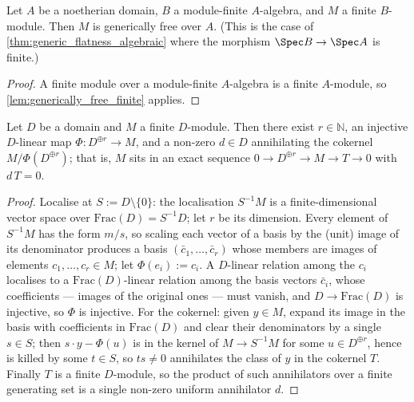 \begin{lemma}
  \label{lem:generically_free_module_finite}
  Let \(A\) be a noetherian domain, \(B\) a module-finite \(A\)-algebra, and
  \(M\) a finite \(B\)-module.  Then \(M\) is generically free over \(A\).
  (This is the case of \cref{thm:generic_flatness_algebraic} where the
  morphism \(\Spec B \to \Spec A\) is finite.)
\end{lemma}

\begin{proof}
\leanok
  A finite module over a module-finite \(A\)-algebra is a finite
  \(A\)-module, so \cref{lem:generically_free_finite} applies.
\end{proof}

\begin{lemma}
  \label{lem:generic_rank_comparison}
  Let \(D\) be a domain and \(M\) a finite \(D\)-module.  Then there exist
  \(r \in \mathbb{N}\), an injective \(D\)-linear map
  \(\Phi : D^{\oplus r} \to M\),
  and a non-zero \(d \in D\) annihilating the cokernel
  \(M / \Phi(D^{\oplus r})\); that is, \(M\) sits in an exact sequence
  \(0 \to D^{\oplus r} \to M \to T \to 0\) with \(d\,T = 0\).
\end{lemma}

\begin{proof}
\leanok
  Localise at \(S := D \setminus \{0\}\): the localisation \(S^{-1}M\) is a
  finite-dimensional vector space over \(\mathrm{Frac}(D) = S^{-1}D\); let
  \(r\) be its dimension.  Every element of \(S^{-1}M\) has the form
  \(m/s\), so scaling each vector of a basis by the (unit) image of its
  denominator produces a basis \((\bar c_1, \dots, \bar c_r)\) whose members
  are images of elements \(c_1, \dots, c_r \in M\); let
  \(\Phi(e_i) := c_i\).  A \(D\)-linear relation among the \(c_i\)
  localises to a \(\mathrm{Frac}(D)\)-linear relation among the basis
  vectors \(\bar c_i\), whose coefficients — images of the original ones —
  must vanish, and \(D \to \mathrm{Frac}(D)\) is injective, so \(\Phi\) is
  injective.  For the cokernel: given \(y \in M\), expand its image in the
  basis with coefficients in \(\mathrm{Frac}(D)\) and clear their
  denominators by a single \(s \in S\); then \(s \cdot y - \Phi(u)\) is in
  the kernel of \(M \to S^{-1}M\) for some \(u \in D^{\oplus r}\), hence is
  killed by some \(t \in S\), so \(ts \ne 0\) annihilates the class of
  \(y\) in the cokernel \(T\).  Finally \(T\) is a finite \(D\)-module, so
  the product of such annihilators over a finite generating set is a single
  non-zero uniform annihilator \(d\).
\end{proof}

